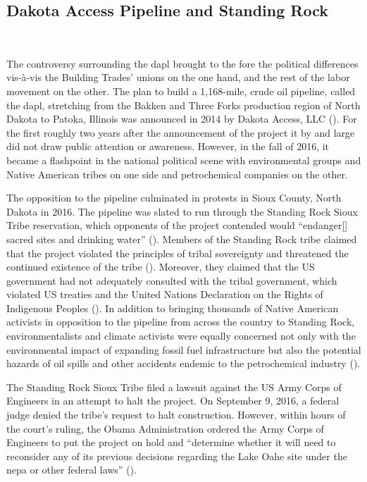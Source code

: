 \documentclass[12pt]{article}
\begin{document}
\subsection{Dakota Access Pipeline and Standing Rock}\

The controversy surrounding the \acrfull{dapl} brought to the fore the political differences vis-\`a-vis the Building Trades' unions on the one hand, and the rest of the labor movement on the other. The plan to build a 1,168-mile, crude oil pipeline, called the \acrshort{dapl}, stretching from the Bakken and Three Forks production region of North Dakota to Patoka, Illinois was announced in 2014 by Dakota Access, LLC (\cite{oconnellDakotaAccessPipeline2018, sahaFiveThingsKnow2016, usarmycorpsofengineersDakotaAccessPipeline}). For the first roughly two years after the announcement of the project it by and large did not draw public attention or awareness. However, in the fall of 2016, it became a flashpoint in the national political scene with environmental groups and Native American tribes on one side and petrochemical companies on the other. 

The opposition to the pipeline culminated in protests in Sioux County, North Dakota in 2016. The pipeline was slated to run through the Standing Rock Sioux Tribe reservation, which opponents of the project contended would “endanger[] sacred sites and drinking water” (\cite{sahaFiveThingsKnow2016}). Members of the Standing Rock tribe claimed that the project violated the principles of tribal sovereignty and threatened the continued existence of the tribe (\cite{massieUnderstandDakotaAccess2016}). Moreover, they claimed that the US government had not adequately consulted with the tribal government, which violated US treaties and the United Nations Declaration on the Rights of Indigenous Peoples (\cite{sahaFiveThingsKnow2016}). In addition to bringing thousands of Native American activists in opposition to the pipeline from across the country to Standing Rock, environmentalists and climate activists were equally concerned not only with the environmental impact of expanding fossil fuel infrastructure but also the potential hazards of oil spills  and other accidents endemic to the petrochemical industry (\cite{sahaFiveThingsKnow2016}). 

The Standing Rock Sioux Tribe filed a lawsuit against the US Army Corps of Engineers in an attempt to halt the project. On September 9, 2016, a federal judge denied the tribe’s request to halt construction. However, within hours of the court’s ruling, the Obama Administration ordered the Army Corps of Engineers to put the project on hold and “determine whether it will need to reconsider any of its previous decisions regarding the Lake Oahe site under the \acrfull{nepa} or other federal laws” (\cite{officeofpublicaffairsJointStatementDepartment2016}). 
\end{document}
